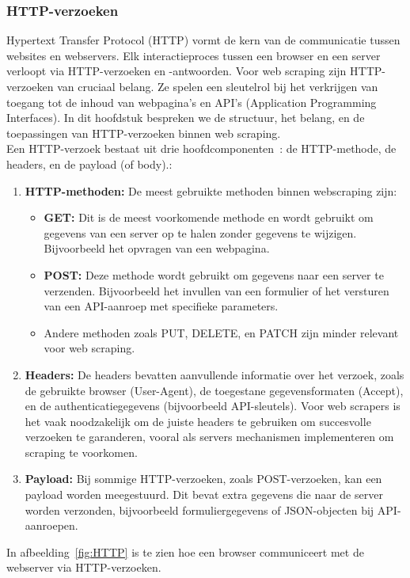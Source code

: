 \subsubsection{HTTP-verzoeken}
\label{sec:HTTP}
Hypertext Transfer Protocol (HTTP) vormt de kern van de communicatie tussen websites en webservers. Elk interactieproces tussen een browser en een server verloopt via HTTP-verzoeken en -antwoorden. Voor web scraping zijn HTTP-verzoeken van cruciaal belang. Ze spelen een sleutelrol bij het verkrijgen van toegang tot de inhoud van webpagina's en API's (Application Programming Interfaces). In dit hoofdstuk bespreken we de structuur, het belang, en de toepassingen van HTTP-verzoeken binnen web scraping.
\\
Een HTTP-verzoek bestaat uit drie hoofdcomponenten~\autocite{Fielding1997}: de HTTP-methode, de headers, en de payload (of body).:
\begin{enumerate}
    \item \textbf{HTTP-methoden:} De meest gebruikte methoden binnen webscraping zijn:
        \begin{itemize}
            \item \textbf{GET:} Dit is de meest voorkomende methode en wordt gebruikt om gegevens van een server op te halen zonder gegevens te wijzigen. Bijvoorbeeld het opvragen van een webpagina.
            \item \textbf{POST:} Deze methode wordt gebruikt om gegevens naar een server te verzenden. Bijvoorbeeld het invullen van een formulier of het versturen van een API-aanroep met specifieke parameters.
            \item Andere methoden zoals PUT, DELETE, en PATCH zijn minder relevant voor web scraping.
        \end{itemize}
   \item \textbf{Headers: }De headers bevatten aanvullende informatie over het verzoek, zoals de gebruikte browser (User-Agent), de toegestane gegevensformaten (Accept), en de authenticatiegegevens (bijvoorbeeld API-sleutels). Voor web scrapers is het vaak noodzakelijk om de juiste headers te gebruiken om succesvolle verzoeken te garanderen, vooral als servers mechanismen implementeren om scraping te voorkomen.
   \item \textbf{Payload: }Bij sommige HTTP-verzoeken, zoals POST-verzoeken, kan een payload worden meegestuurd. Dit bevat extra gegevens die naar de server worden verzonden, bijvoorbeeld formuliergegevens of JSON-objecten bij API-aanroepen.
\end{enumerate}
In afbeelding~\ref{fig:HTTP} is te zien hoe een browser communiceert met de webserver via HTTP-verzoeken.

